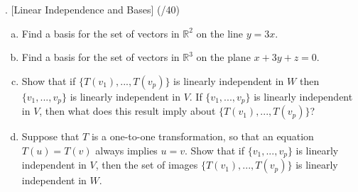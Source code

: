 \documentclass[11pt]{article}
\begin{document}
\vspace{3em}

. [Linear Independence and Bases] (/40)

\begin{enumerate}[(a)]
\item Find a basis for the set of vectors in $\mathbb{R}^2$ on the line $y=3x$.
\item Find a basis for the set of vectors in $\mathbb{R}^3$ on the plane $x+3y+z=0$.
\item Show that if $\{T(v_1),...,T(v_p)\}$ is linearly independent in $W$ then $\{v_1,...,v_p\}$ is linearly independent in $V$. If $\{v_1,...,v_p\}$ is linearly independent in $V$, then what does this result imply about $\{T(v_1),...,T(v_p)\}$?
\item Suppose that $T$ is a one-to-one transformation, so that an equation $T(u)=T(v)$ always implies $u=v$. Show that if $\{v_1,...,v_p\}$ is linearly independent in $V$, then the set of images $\{T(v_1),...,T(v_p)\}$ is linearly independent in $W$.
\end{enumerate}
\end{document}
